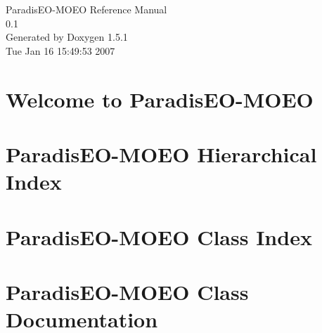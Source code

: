 \documentclass[a4paper]{book}
\begin{document}
\begin{titlepage}
\vspace*{7cm}
\begin{center}
{\Large Paradis\-EO-MOEO Reference Manual\\[1ex]\large 0.1 }\\
\vspace*{1cm}
{\large Generated by Doxygen 1.5.1}\\
\vspace*{0.5cm}
{\small Tue Jan 16 15:49:53 2007}\\
\end{center}
\end{titlepage}
\clearemptydoublepage
{}
\tableofcontents
\clearemptydoublepage
{}
\chapter{Welcome to Paradis\-EO-MOEO }
\label{index}
\chapter{Paradis\-EO-MOEO Hierarchical Index}

\chapter{Paradis\-EO-MOEO Class Index}

\chapter{Paradis\-EO-MOEO Class Documentation}




































\printindex
\end{document}
